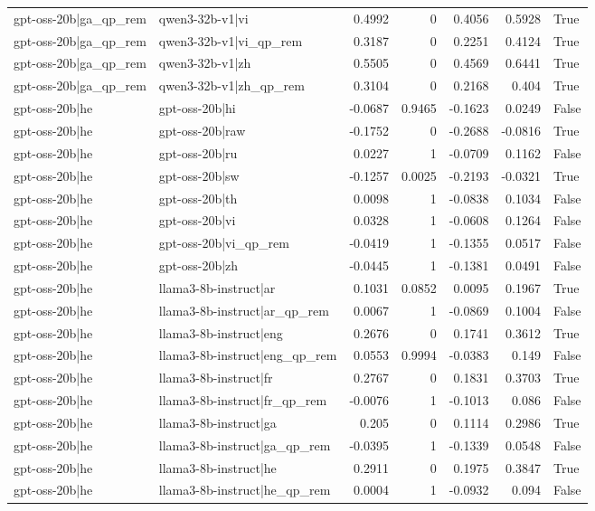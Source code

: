 \begin{table}
\begin{tabular}{l l r r r r l}
gpt-oss-20b|ga_qp_rem & qwen3-32b-v1|vi & 0.4992 & 0 & 0.4056 & 0.5928 & True \\
gpt-oss-20b|ga_qp_rem & qwen3-32b-v1|vi_qp_rem & 0.3187 & 0 & 0.2251 & 0.4124 & True \\
gpt-oss-20b|ga_qp_rem & qwen3-32b-v1|zh & 0.5505 & 0 & 0.4569 & 0.6441 & True \\
gpt-oss-20b|ga_qp_rem & qwen3-32b-v1|zh_qp_rem & 0.3104 & 0 & 0.2168 & 0.404 & True \\
gpt-oss-20b|he & gpt-oss-20b|hi & -0.0687 & 0.9465 & -0.1623 & 0.0249 & False \\
gpt-oss-20b|he & gpt-oss-20b|raw & -0.1752 & 0 & -0.2688 & -0.0816 & True \\
gpt-oss-20b|he & gpt-oss-20b|ru & 0.0227 & 1 & -0.0709 & 0.1162 & False \\
gpt-oss-20b|he & gpt-oss-20b|sw & -0.1257 & 0.0025 & -0.2193 & -0.0321 & True \\
gpt-oss-20b|he & gpt-oss-20b|th & 0.0098 & 1 & -0.0838 & 0.1034 & False \\
gpt-oss-20b|he & gpt-oss-20b|vi & 0.0328 & 1 & -0.0608 & 0.1264 & False \\
gpt-oss-20b|he & gpt-oss-20b|vi_qp_rem & -0.0419 & 1 & -0.1355 & 0.0517 & False \\
gpt-oss-20b|he & gpt-oss-20b|zh & -0.0445 & 1 & -0.1381 & 0.0491 & False \\
gpt-oss-20b|he & llama3-8b-instruct|ar & 0.1031 & 0.0852 & 0.0095 & 0.1967 & True \\
gpt-oss-20b|he & llama3-8b-instruct|ar_qp_rem & 0.0067 & 1 & -0.0869 & 0.1004 & False \\
gpt-oss-20b|he & llama3-8b-instruct|eng & 0.2676 & 0 & 0.1741 & 0.3612 & True \\
gpt-oss-20b|he & llama3-8b-instruct|eng_qp_rem & 0.0553 & 0.9994 & -0.0383 & 0.149 & False \\
gpt-oss-20b|he & llama3-8b-instruct|fr & 0.2767 & 0 & 0.1831 & 0.3703 & True \\
gpt-oss-20b|he & llama3-8b-instruct|fr_qp_rem & -0.0076 & 1 & -0.1013 & 0.086 & False \\
gpt-oss-20b|he & llama3-8b-instruct|ga & 0.205 & 0 & 0.1114 & 0.2986 & True \\
gpt-oss-20b|he & llama3-8b-instruct|ga_qp_rem & -0.0395 & 1 & -0.1339 & 0.0548 & False \\
gpt-oss-20b|he & llama3-8b-instruct|he & 0.2911 & 0 & 0.1975 & 0.3847 & True \\
gpt-oss-20b|he & llama3-8b-instruct|he_qp_rem & 0.0004 & 1 & -0.0932 & 0.094 & False \\

\end{tabular}
\end{table}
